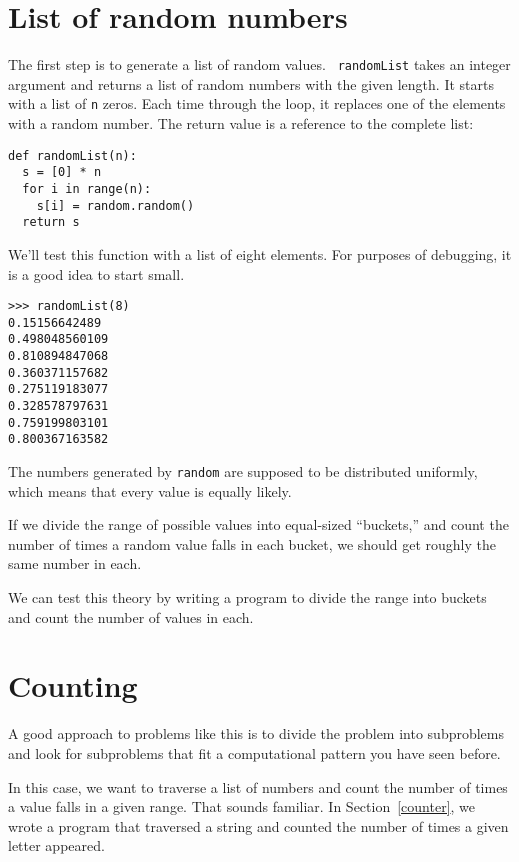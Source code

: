 \section{List of random numbers}

The first step is to generate a list of random values.  {\tt
randomList} takes an integer argument and returns a list of random
numbers with the given length.  It starts with a list of {\tt n}
zeros.  Each time through the loop, it replaces one of the elements
with a random number.
The return value is a reference to the complete list:

\beforeverb
\begin{verbatim}
def randomList(n):
  s = [0] * n
  for i in range(n):
    s[i] = random.random()
  return s
\end{verbatim}
\afterverb
%
We'll test this function with a list of eight elements.  For
purposes of debugging, it is a good idea to start small.

\pagebreak

\beforeverb
\begin{verbatim}
>>> randomList(8)
0.15156642489
0.498048560109
0.810894847068
0.360371157682
0.275119183077
0.328578797631
0.759199803101
0.800367163582
\end{verbatim}
\afterverb
%
The numbers generated by {\tt random} are supposed to be distributed
uniformly, which means that every value is equally likely.

If we divide the range of possible
values into equal-sized ``buckets,'' and count the number of times a
random value falls in each bucket, we should get roughly the
same number in each.

We can test this theory by writing a program to 
divide the range into
buckets and count the number of values in each.


\section{Counting}

A good approach to problems like this is to divide the problem into
subproblems and look for subproblems that fit a computational pattern
you have seen before.

In this case, we want to traverse a list of numbers and count the
number of times a value falls in a given range.  That sounds familiar.
In Section~\ref{counter}, we wrote a program that traversed a string and
counted the number of times a given letter appeared.

